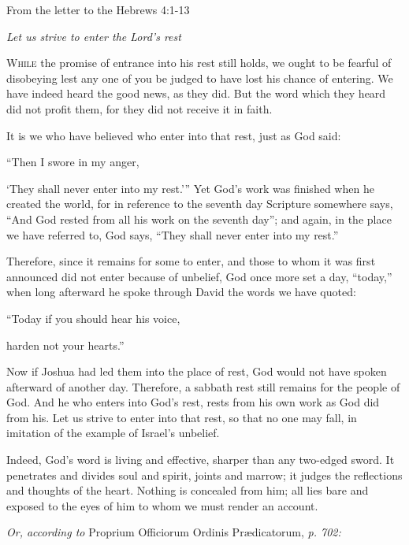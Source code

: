 \noindent From the letter to the Hebrews \hfill 4:1-13

\begin{center}\textit{Let us strive to enter the Lord’s rest}\end{center}

\lettrine[lines=3,loversize=0.15]{W}{hile} the promise of entrance into his rest still holds, we ought to be fearful of disobeying lest any one of you be judged to have lost his chance of entering. We have indeed heard the good news, as they did. But the word which they heard did not profit them, for they did not receive it in faith.

It is we who have believed who enter into that rest, just as God said:

\vspace{5pt}
 “Then I swore in my anger,\par
    ‘They shall never enter into my rest.’”
\vspace{5pt}
Yet God’s work was finished when he created the world, for in reference to the seventh day Scripture somewhere says, “And God rested from all his work on the seventh day”; and again, in the place we have referred to, God says, “They shall never enter into my rest.”

Therefore, since it remains for some to enter, and those to whom it was first announced did not enter because of unbelief, God once more set a day, “today,” when long afterward he spoke through David the words we have quoted:

\vspace{5pt}
   “Today if you should hear his voice,\par
      harden not your hearts.”
\vspace{5pt}

Now if Joshua had led them into the place of rest, God would not have spoken afterward of another day. Therefore, a sabbath rest still remains for the people of God. And he who enters into God’s rest, rests from his own work as God did from his. Let us strive to enter into that rest, so that no one may fall, in imitation of the example of Israel’s unbelief.

Indeed, God’s word is living and effective, sharper than any two-edged sword. It penetrates and divides soul and spirit, joints and marrow; it judges the reflections and thoughts of the heart. Nothing is concealed from him; all lies bare and exposed to the eyes of him to whom we must render an account.

\vspace{5pt}

\textit{Or, according to} Proprium Officiorum Ordinis Prædicatorum, \textit{p. 702:}

